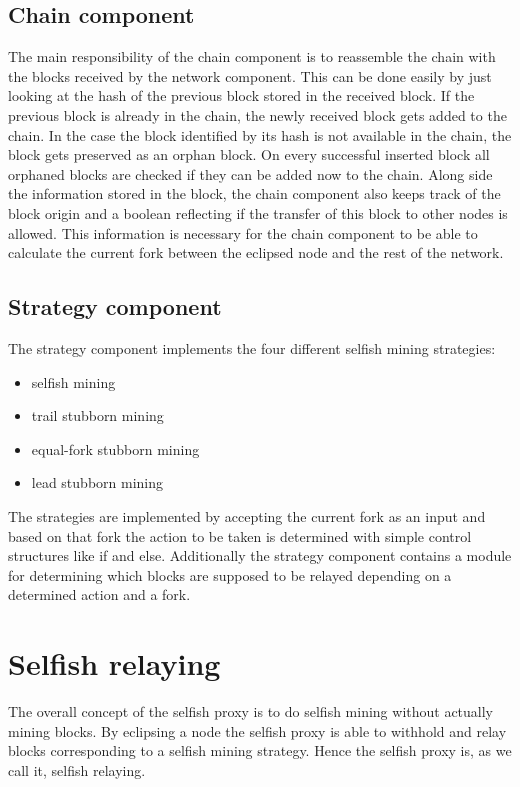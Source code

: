 \subsection{Chain component}
The main responsibility of the chain component is to reassemble the chain with the blocks received by the network component.
This can be done easily by just looking at the hash of the previous block stored in the received block.
If the previous block is already in the chain, the newly received block gets added to the chain.
In the case the block identified by its hash is not available in the chain, the block gets preserved as an orphan block.
On every successful inserted block all orphaned blocks are checked if they can be added now to the chain.
Along side the information stored in the block, the chain component also keeps track of the block origin and a boolean reflecting if the transfer of this block to other nodes is allowed.
This information is necessary for the chain component to be able to calculate the current fork between the eclipsed node and the rest of the network.

\subsection{Strategy component}
The strategy component implements the four different selfish mining strategies:
\begin{itemize}
 \item selfish mining
 \item trail stubborn mining
 \item equal-fork stubborn mining
 \item lead stubborn mining
\end{itemize}

The strategies are implemented by accepting the current fork as an input and based on that fork the action to be taken is determined with simple control structures like if and else.
Additionally the strategy component contains a module for determining which blocks are supposed to be relayed depending on a determined action and a fork.

\section{Selfish relaying}

The overall concept of the selfish proxy is to do selfish mining without actually mining blocks.
By eclipsing a node the selfish proxy is able to withhold and relay blocks corresponding to a selfish mining strategy.
Hence the selfish proxy is, as we call it, selfish relaying.

